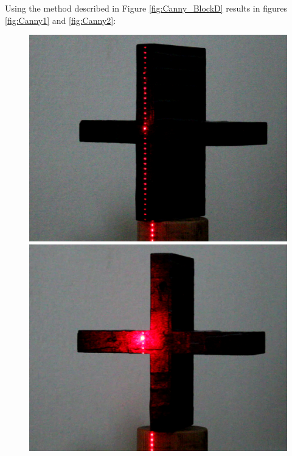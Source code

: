 Using the method described in Figure \ref{fig:Canny_BlockD} results in figures \ref{fig:Canny1} and \ref{fig:Canny2}:
\begin{figure}[ht!]
	\centering
	\begin{minipage}[t]{0.3\textwidth}
		\centering
		\includegraphics[width=1\textwidth]{figures/ImageAnalysis/Crop/cross1_base.png}
	\end{minipage}
	\hspace{0.02\textwidth}
	\begin{minipage}[t]{0.3\textwidth}
		\centering
		\includegraphics[width=1\textwidth]{figures/ImageAnalysis/Crop/cross1_glare.png}

\end{minipage}
\end{figure}
